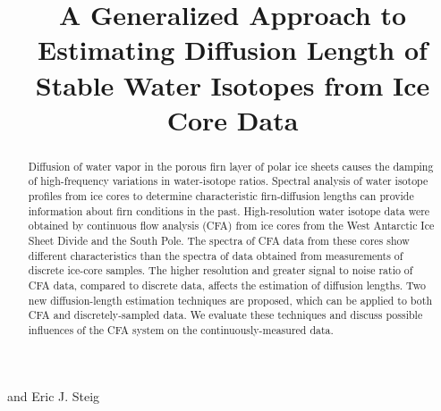 \documentclass[draft, jgrga]{AGUTeX}
\begin{document}

\title{A Generalized Approach to Estimating Diffusion Length of Stable Water Isotopes from Ice Core Data}




 and Eric J. Steig






\begin{abstract}

Diffusion of water vapor in the porous firn layer of polar ice sheets causes the damping of high-frequency variations in water-isotope ratios. Spectral analysis of water isotope profiles from ice cores to determine characteristic firn-diffusion lengths can provide information about firn conditions in the past. High-resolution water isotope data were obtained by continuous flow analysis (CFA) from ice cores from the West Antarctic Ice Sheet Divide and the South Pole. The spectra of CFA data from these cores show different characteristics than the spectra of data obtained from measurements of discrete ice-core samples.  The higher resolution and greater signal to noise ratio of CFA data, compared to discrete data, affects the estimation of diffusion lengths. Two new diffusion-length estimation techniques are proposed, which can be applied to both CFA and discretely-sampled data. We evaluate these techniques and discuss possible influences of the CFA system on the continuously-measured data.

\end{abstract}
\end{document}
